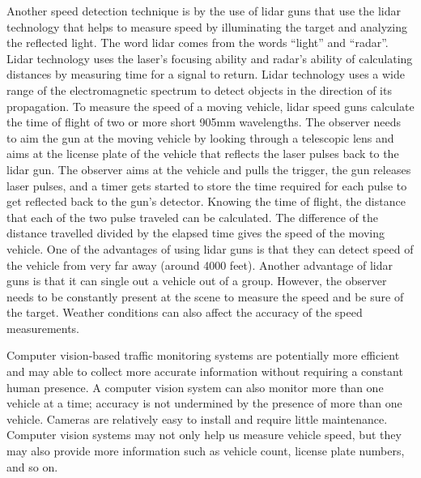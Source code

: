 \documentclass[a4paper]{aitthesis}
\begin{document}
Another speed detection technique is by the use of lidar guns that use the lidar technology that helps to measure speed by illuminating the target and analyzing the reflected light. The word lidar comes from the words ``light'' and ``radar''. Lidar technology uses the laser's focusing ability and radar's ability of calculating distances by measuring time for a signal to return. Lidar technology uses a wide range of the electromagnetic spectrum to detect objects in the direction of its propagation. To measure the speed of a moving vehicle, lidar speed guns calculate the time of flight of two or more short 905mm wavelengths. The observer needs to aim the gun at the moving vehicle by looking through a telescopic lens and aims at the license plate of the vehicle that reflects the laser pulses back to the lidar gun. The observer aims at the vehicle and pulls the trigger, the gun releases laser pulses, and a timer gets started to store the time required for each pulse to get reflected back to the gun's detector. Knowing the time of flight, the distance that each of the two pulse traveled can be calculated. The difference of the distance travelled divided by the elapsed time gives the speed of the moving vehicle. \newline \newline
One of the advantages of using lidar guns is that they can detect speed of the vehicle from very far away (around 4000 feet). Another advantage of lidar guns is that it can single out a vehicle out of a group. However, the observer needs to be constantly present at the scene to measure the speed and be sure of the target. Weather conditions can also affect the accuracy of the speed measurements.

Computer vision-based traffic monitoring systems are potentially more efficient and may able to collect more accurate information without requiring a constant human presence. A computer vision system can also monitor more than one vehicle at a time; accuracy is not undermined by the presence of more than one vehicle. Cameras are relatively easy to install and require little maintenance. Computer vision systems may not only help us measure vehicle speed, but they may also provide more information such as vehicle count, license plate numbers, and so on.
\end{document}
